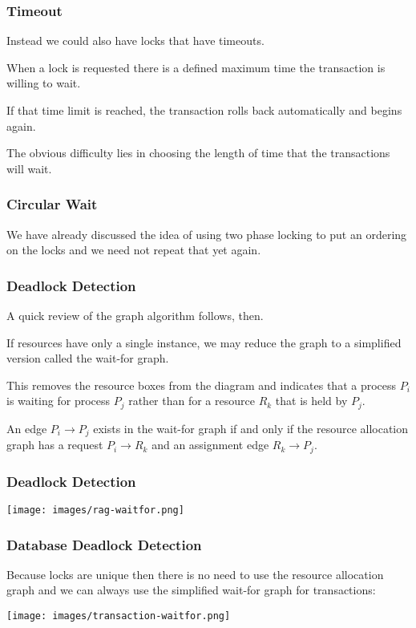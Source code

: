 \begin{frame}
\frametitle{Timeout}

Instead we could also have locks that have timeouts. 

When a lock is requested there is a defined maximum time the transaction is willing to wait. 

If that time limit is reached, the transaction rolls back automatically and begins again. 

The obvious difficulty lies in choosing the length of time that the transactions will wait.

\end{frame}

\begin{frame}
\frametitle{Circular Wait}

We have already discussed the idea of using two phase locking to put an ordering on the locks and we need not repeat that yet again. 


\end{frame}

\begin{frame}
\frametitle{Deadlock Detection}

A quick review of the graph algorithm follows, then. 

If resources have only a single instance, we may reduce the graph to a simplified version called the \alert{wait-for} graph. 

This removes the resource boxes from the diagram and indicates that a process $P_{i}$ is waiting for process $P_{j}$ rather than for a resource $R_{k}$ that is held by $P_{j}$. 

An edge $P_{i} \rightarrow P_{j}$ exists in the wait-for graph if and only if the resource allocation graph has a request $P_{i} \rightarrow R_{k}$ and an assignment edge $R_{k} \rightarrow P_{j}$. 

\end{frame}


\begin{frame}
\frametitle{Deadlock Detection}

\begin{center}
\texttt{[image: images/rag-waitfor.png]}
\end{center}


\end{frame}


\begin{frame}
\frametitle{Database Deadlock Detection}

Because locks are unique then there is no need to use the resource allocation graph and we can always use the simplified wait-for graph for transactions:

\begin{center}
\texttt{[image: images/transaction-waitfor.png]}
\end{center}


\end{frame}

